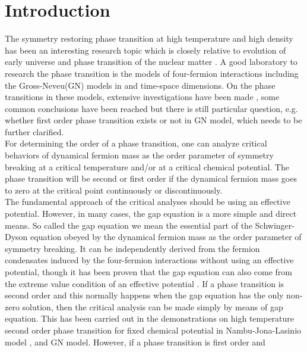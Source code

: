 \documentclass[a4paper,eqsecnum]{revtex4}
\begin{document}
\section{Introduction\label{sec:intro}}
The symmetry restoring phase transition at high temperature and high density has been 
an interesting research topic which is closely relative to evolution of early universe 
and phase transition of the nuclear matter \cite{kn:1,kn:2,kn:3,kn:4}. A good 
laboratory to research the phase transition is the models of four-fermion 
interactions including the Gross-Neveu(GN) models in \coordHE{} and \coordHE{} \cite{kn:5} 
time-space dimensions. On the phase transitions in these models, extensive 
investigations have been made \cite{kn:6,kn:7,kn:8,kn:9, kn:10, kn:11, kn:12, kn:13}, 
some common conclusions have been reached  but there is still particular question, 
e.g. whether first order phase transition exists or not in \coordHE{} GN model, which needs 
to be further clarified. \\
\indent For determining the order of a phase transition, one can analyze critical 
behaviors of dynamical fermion mass as the order parameter of symmetry breaking at 
a critical temperature and/or at a critical chemical potential. The phase transition 
will be second or first order if the dynamical fermion mass goes to zero at the critical 
point continuously or discontinuously. \\
\indent The fundamental approach of the critical analyses should be using an effective 
potential. However, in many cases, the gap equation is a more simple and direct means. 
So called the gap equation we mean the essential part of the Schwinger-Dyson equation 
obeyed  by the dynamical fermion mass as the order parameter of symmetry breaking. 
It can be independently derived from the fermion condensates induced by the 
four-fermion interactions without using an effective potential, though it has 
been proven that the gap equation can also come from the extreme value condition of 
an effective potential \cite{kn:14}. If a phase transition is second order and this 
normally happens when the gap equation has the only non-zero solution, then the 
critical analysis can be made simply by means of gap equation. This has been carried 
out in the demonstrations on high temperature second order phase transition for fixed 
chemical potential in \coordHE{} Nambu-Jona-Lasinio model \cite{kn:15},\coordHE{} \cite{kn:16} and \coordHE{} \cite{kn:17} GN model. However, if a phase transition is first order and 
\end{document}
